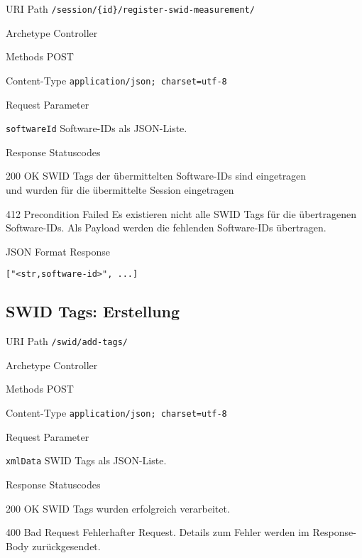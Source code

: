 \documentclass[10pt,a4paper]{scrartcl}
\begin{document}
\begin{mdframed}[style=def]
\begin{description*}
	\item[URI Path] \texttt{/session/\{id\}/register-swid-measurement/}
	\item[Archetype] Controller
	\item[Methods] POST
	\item[Content-Type] \texttt{application/json; charset=utf-8}
	\item[Request Parameter] \hfill
	\begin{description*}
		\item[\texttt{softwareId}] Software-IDs als JSON-Liste.
	\end{description*}
	\item[Response Statuscodes] \hfill
		\begin{description*}
			\item[200 OK] SWID Tags der übermittelten Software-IDs sind eingetragen \\
			und wurden für die übermittelte Session eingetragen
			\item[412 Precondition Failed] Es existieren nicht alle SWID Tags für die
				übertragenen Software-IDs. Als Payload werden die fehlenden Software-IDs
				übertragen.
		\end{description*}
	\item[JSON Format Response] \hfill
\begin{lstlisting}
["<str,software-id>", ...]
\end{lstlisting}
\end{description*}
\end{mdframed}


\subsection{SWID Tags: Erstellung}
\label{api:create}

\begin{mdframed}[style=def]
\begin{description*}
	\item[URI Path] \texttt{/swid/add-tags/}
	\item[Archetype] Controller
	\item[Methods] POST
	\item[Content-Type] \texttt{application/json; charset=utf-8}
	\item[Request Parameter] \hfill
		\begin{description*}
			\item[\texttt{xmlData}] SWID Tags als JSON-Liste.
		\end{description*}
	\item[Response Statuscodes] \hfill
		\begin{description*}
			\item[200 OK] SWID Tags wurden erfolgreich verarbeitet.
			\item[400 Bad Request] Fehlerhafter Request. Details zum Fehler werden im
				Response-Body zurückgesendet.
		\end{description*}
\end{description*}
\end{mdframed}
\end{document}

